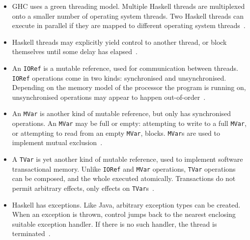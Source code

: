 \begin{itemize}
\item GHC uses a green threading model.  Multiple Haskell threads are
  multiplexed onto a smaller number of operating system threads.  Two
  Haskell threads can execute in parallel if they are mapped to
  different operating system
  threads~.


\item Haskell threads may explicitly yield control to another thread,
  or block themselves until some delay has
  elapsed~.

\item An \verb|IORef| is a mutable reference, used for communication
  between threads.  \verb|IORef| operations come in two kinds:
  synchronised and unsynchronised.  Depending on the memory model of
  the processor the program is running on, unsynchronised operations
  may appear to happen out-of-order~.

\item An \verb|MVar| is another kind of mutable reference, but only
  has synchronised operations.  An \verb|MVar| may be full or empty:
  attempting to write to a full \verb|MVar|, or attempting to read
  from an empty \verb|MVar|, blocks.  \verb|MVar|s are used to
  implement mutual exclusion~.

\item A \verb|TVar| is yet another kind of mutable reference, used to
  implement software transactional memory.  Unlike \verb|IORef| and
  \verb|MVar| operations, \verb|TVar| operations can be composed, and
  the whole executed atomically.  Transactions do not permit arbitrary
  effects, only effects on \verb|TVar|s~.

\item Haskell has exceptions.  Like Java, arbitrary exception types
  can be created.  When an exception is thrown, control jumps back to
  the nearest enclosing suitable exception handler.  If there is no
  such handler, the thread is
  terminated~.


\end{itemize}
